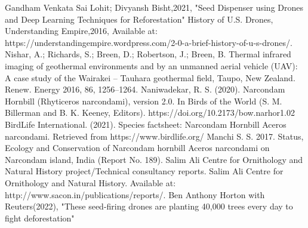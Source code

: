 \documentclass[conference]{IEEEtran}
\begin{document}
\begin{thebibliography}{1}
 Gandham Venkata Sai Lohit; Divyansh Bisht,2021, "Seed Dispenser using Drones and Deep Learning Techniques for Reforestation"
History of U.S. Drones, Understanding Empire,2016, Available at: https://understandingempire.wordpress.com/2-0-a-brief-history-of-u-s-drones/.
 Nishar, A.; Richards, S.; Breen, D.; Robertson, J.; Breen, B. Thermal infrared imaging of geothermal environments and by an unmanned aerial vehicle (UAV): A case study of the Wairakei – Tauhara geothermal field, Taupo, New Zealand. Renew. Energy 2016, 86, 1256–1264.
 Naniwadekar, R. S. (2020). Narcondam Hornbill (Rhyticeros narcondami), version 2.0. In Birds of the World (S. M. Billerman and B. K. Keeney, Editors). 
https://doi.org/10.2173/bow.narhor1.02
BirdLife International. (2021). Species factsheet: Narcondam Hornbill Aceros narcondami. Retrieved from https://www.birdlife.org/
 Manchi S. S. 2017. Status, Ecology and Conservation of Narcondam hornbill Aceros narcondami on Narcondam island, India (Report No. 189). Salim Ali Centre for Ornithology and Natural History project/Technical consultancy reports. Salim Ali Centre for Ornithology and Natural History. Available at: http://www.sacon.in/publications/reports/.
 Ben Anthony Horton  with Reuters(2022), "These seed-firing drones are planting 40,000 trees every day to fight deforestation"
\end{thebibliography}
\end{document}
